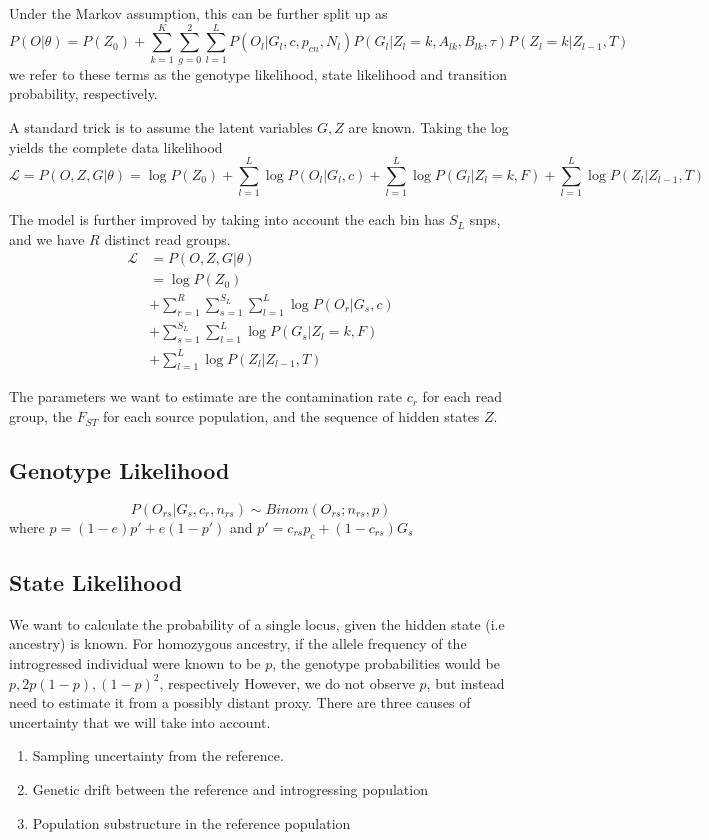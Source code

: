 \documentclass[10pt,a4paper]{article}
\begin{document}
Under the Markov assumption, this can be further split up as
$$P(O | \theta) = P(Z_0) +
\sum_{k=1}^K \sum_{g=0}^2 \sum_{l=1}^L 
P(O_l | G_l, c, p_{cn}, N_l)
P(G_l | Z_l = k, A_{lk}, B_{lk}, \tau)
P(Z_l = k |Z_{l-1}, T) $$
we refer to these terms as the genotype likelihood, state likelihood and transition probability, respectively.

A standard trick is to assume the latent variables $G, Z$ are known. Taking the log
yields the complete data likelihood
\begin{equation}
\mathcal{L}  = P(O, Z, G | \theta) = \log P(Z_0) 
+ \sum_{l=1}^L \log P(O_l | G_l, c)
+ \sum_{l=1}^L \log P(G_l | Z_l = k, F)
+ \sum_{l=1}^L  \log P(Z_l |Z_{l-1}, T) \label{eq:ll:simple}
\end{equation}

The model is further improved by taking into account the each bin has $S_L$ snps, and we have $R$ distinct read groups.
\begin{align}
\mathcal{L}  &= P(O, Z, G | \theta)  \nonumber\\
&=\log P(Z_0) \nonumber\\
&+ \sum_{r=1}^R\sum_{s=1}^{S_L}\sum_{l=1}^L \log P(O_r | G_s, c)\nonumber\\
&+ \sum_{s=1}^{S_L}\sum_{l=1}^L \log P(G_s | Z_l = k, F)\nonumber\\
&+ \sum_{l=1}^L  \log P(Z_l |Z_{l-1}, T) \label{eq:ll:correct}
\end{align}

The parameters we want to estimate are the contamination rate $c_r$ for each read group, the $F_{ST}$ for each source population, and the sequence of hidden states $Z$.

\subsection{Genotype Likelihood}
\begin{equation}
P(O_{rs}| G_s, c_r, n_{rs}) \sim Binom(O_{rs}; n_{rs}, p) \label{eq:ll:geno}
\end{equation}
where $p = (1-e) p' + e (1-p')$
and $p' =c_{rs} p_c + (1-c_{rs}) G_s$
\subsection{State Likelihood}
We want to calculate the probability of a single locus, given the hidden state (i.e ancestry) is known. For homozygous ancestry, if the allele frequency of the introgressed individual were known to be $p$, the genotype probabilities would be $p, 2p(1-p), (1-p)^2$, respectively However, we do not observe $p$, but instead need  to estimate it from a possibly distant proxy. There are three causes of uncertainty that we will take into account.
\begin{enumerate}
	\item Sampling uncertainty from the reference.	
	\item Genetic drift between the reference and introgressing population
	\item Population substructure in the reference population
\end{enumerate}
\end{document}
